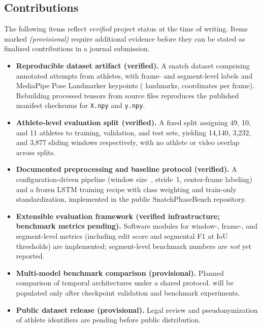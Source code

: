 \subsection{Contributions}
\label{sec:contributions}

The following items reflect \emph{verified} project status at the time of writing.
Items marked \emph{(provisional)} require additional evidence before they can be stated as finalized contributions in a journal submission.

\begin{itemize}
  \item \textbf{Reproducible dataset artifact (verified).}
        A snatch dataset comprising \numvideos{} annotated attempts from \numathletes{} athletes, with frame- and segment-level labels and MediaPipe Pose Landmarker keypoints (\numlandmarks{} landmarks, \featuredim{} coordinates per frame).
        Rebuilding processed tensors from source files reproduces the published manifest checksums for \texttt{X.npy} and \texttt{y.npy}.

  \item \textbf{Athlete-level evaluation split (verified).}
        A fixed split assigning 49, 10, and 11 athletes to training, validation, and test sets, yielding 14{,}140, 3{,}232, and 3{,}877 sliding windows respectively, with no athlete or video overlap across splits.

  \item \textbf{Documented preprocessing and baseline protocol (verified).}
        A configuration-driven pipeline (window size~\windowsize, stride~1, center-frame labeling) and a frozen \acs{LSTM} training recipe with class weighting and train-only standardization, implemented in the public SnatchPhaseBench repository.

  \item \textbf{Extensible evaluation framework (verified infrastructure; benchmark metrics pending).}
        Software modules for window-, frame-, and segment-level metrics (including edit score and segmental F1 at IoU thresholds) are implemented; segment-level benchmark numbers are \emph{not} yet reported.

  \item \textbf{Multi-model benchmark comparison (provisional).}
        Planned comparison of temporal architectures under a shared protocol.
         will be populated only after checkpoint validation and benchmark experiments.

  \item \textbf{Public dataset release (provisional).}
        Legal review and pseudonymization of athlete identifiers are pending before public distribution.
\end{itemize}

